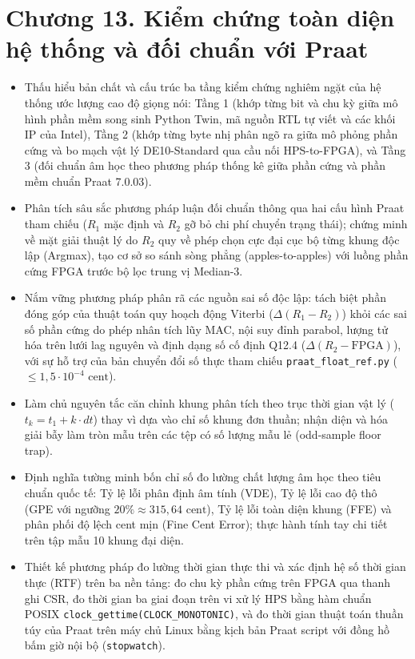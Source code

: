 \clearpage
{}
\section*{Chương 13. Kiểm chứng toàn diện hệ thống và đối chuẩn với Praat}

\begin{learningobj}
\begin{itemize}
    \item Thấu hiểu bản chất và cấu trúc ba tầng kiểm chứng nghiêm ngặt của hệ thống ước lượng cao độ giọng nói: Tầng 1 (khớp từng bit và chu kỳ giữa mô hình phần mềm song sinh Python Twin, mã nguồn RTL tự viết và các khối IP của Intel), Tầng 2 (khớp từng byte nhị phân ngõ ra giữa mô phỏng phần cứng và bo mạch vật lý DE10-Standard qua cầu nối HPS-to-FPGA), và Tầng 3 (đối chuẩn âm học theo phương pháp thống kê giữa phần cứng và phần mềm chuẩn Praat 7.0.03).
    \item Phân tích sâu sắc phương pháp luận đối chuẩn thông qua hai cấu hình Praat tham chiếu ($R_1$ mặc định và $R_2$ gỡ bỏ chi phí chuyển trạng thái); chứng minh về mặt giải thuật lý do $R_2$ quy về phép chọn cực đại cục bộ từng khung độc lập (Argmax), tạo cơ sở so sánh sòng phẳng (apples-to-apples) với luồng phần cứng FPGA trước bộ lọc trung vị Median-3.
    \item Nắm vững phương pháp phân rã các nguồn sai số độc lập: tách biệt phần đóng góp của thuật toán quy hoạch động Viterbi ($\Delta(R_1 - R_2)$) khỏi các sai số phần cứng do phép nhân tích lũy MAC, nội suy đỉnh parabol, lượng tử hóa trên lưới lag nguyên và định dạng số cố định Q12.4 ($\Delta(R_2 - \text{FPGA})$), với sự hỗ trợ của bản chuyển đổi số thực tham chiếu \texttt{praat\_float\_ref.py} ($\le 1{,}5 \cdot 10^{-4}\text{ cent}$).
    \item Làm chủ nguyên tắc căn chỉnh khung phân tích theo trục thời gian vật lý ($t_k = t_1 + k \cdot dt$) thay vì dựa vào chỉ số khung đơn thuần; nhận diện và hóa giải bẫy làm tròn mẫu trên các tệp có số lượng mẫu lẻ (odd-sample floor trap).
    \item Định nghĩa tường minh bốn chỉ số đo lường chất lượng âm học theo tiêu chuẩn quốc tế: Tỷ lệ lỗi phân định âm tính (VDE), Tỷ lệ lỗi cao độ thô (GPE với ngưỡng $20\% \approx 315{,}64\text{ cent}$), Tỷ lệ lỗi toàn diện khung (FFE) và phân phối độ lệch cent mịn (Fine Cent Error); thực hành tính tay chi tiết trên tập mẫu 10 khung đại diện.
    \item Thiết kế phương pháp đo lường thời gian thực thi và xác định hệ số thời gian thực (RTF) trên ba nền tảng: đo chu kỳ phần cứng trên FPGA qua thanh ghi CSR, đo thời gian ba giai đoạn trên vi xử lý HPS bằng hàm chuẩn POSIX \texttt{clock\_gettime(CLOCK\_MONOTONIC)}, và đo thời gian thuật toán thuần túy của Praat trên máy chủ Linux bằng kịch bản Praat script với đồng hồ bấm giờ nội bộ (\texttt{stopwatch}).

\end{itemize}
\end{learningobj}

